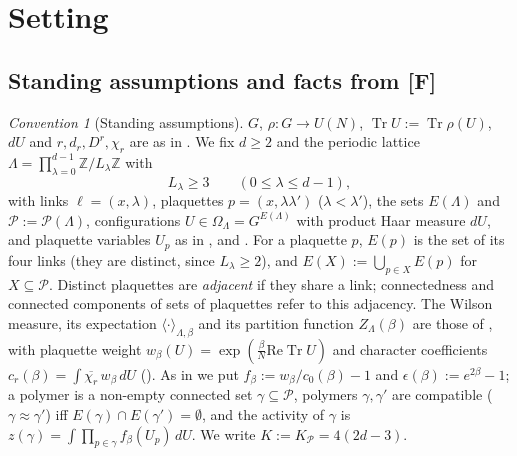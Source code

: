 \documentclass[11pt,a4paper]{article}
\theoremstyle{definition}
\theoremstyle{remark}
\newtheorem{convention}[theorem]{Convention}
\DeclareMathOperator{\Tr}{Tr}
\newcommand{\Z}{\mathbb{Z}}
\newcommand{\cP}{\mathcal{P}}
\newcommand{\dU}{\,dU}
\newcommand{\Fref}[3]{\cite[#1~`#2' (\texttt{#3})]{F}}
\newcommand{\Flab}[2]{\cite[#1 \texttt{#2}]{F}}
\newcommand{\Fname}[2]{\cite[#1~`#2']{F}}
\begin{document}
\section{Setting}\label{al:sec:setting}

\subsection{Standing assumptions and facts from [F]}

\begin{convention}[Standing assumptions]\label{al:conv:standing}
$G$, $\rho:G\to U(N)$, $\Tr U:=\Tr\rho(U)$, $dU$ and $r,d_r,D^r,\chi_r$ are as in \Fname{Convention}{Group}. We fix
$d\ge2$ and the periodic lattice $\Lambda=\prod_{\lambda=0}^{d-1}\Z/L_\lambda\Z$ with
\[
L_\lambda\ge3\qquad(0\le\lambda\le d-1),
\]
with links $\ell=(x,\lambda)$, plaquettes $p=(x,\lambda\lambda')$ ($\lambda<\lambda'$), the sets $E(\Lambda)$ and
$\cP:=\cP(\Lambda)$, configurations $U\in\Omega_\Lambda=G^{E(\Lambda)}$ with product Haar measure $dU$, and plaquette
variables $U_p$ as in \Fname{Convention}{Lattice}, \Fname{Convention}{Configurations} and \Flab{eq.}{eq:plaquette}. For
a plaquette $p$, $E(p)$ is the set of its four links (they are distinct, since $L_\lambda\ge2$), and
$E(X):=\bigcup_{p\in X}E(p)$ for $X\subseteq\cP$. Distinct plaquettes are \emph{adjacent} if they share a link;
connectedness and connected components of sets of plaquettes refer to this adjacency. The Wilson measure, its
expectation $\langle\cdot\rangle_{\Lambda,\beta}$ and its partition function $Z_\Lambda(\beta)$ are those of
\Fref{Definition}{Wilson measure}{def:wilson}, with plaquette weight $w_\beta(U)=\exp(\frac\beta N\mathrm{Re}\Tr U)$ and
character coefficients $c_r(\beta)=\int\overline{\chi_r}\,w_\beta\dU$ (\Fname{Definition}{Plaquette weight}). As in
\Flab{Definition}{def:polymer} we put $f_\beta:=w_\beta/c_0(\beta)-1$ and $\epsilon(\beta):=e^{2\beta}-1$; a polymer is a
non-empty connected set $\gamma\subseteq\cP$, polymers $\gamma,\gamma'$ are compatible ($\gamma\approx\gamma'$) iff
$E(\gamma)\cap E(\gamma')=\emptyset$, and the activity of $\gamma$ is $z(\gamma)=\int\prod_{p\in\gamma}f_\beta(U_p)\dU$.
We write $K:=K_\cP=4(2d-3)$.
\end{convention}
\end{document}
